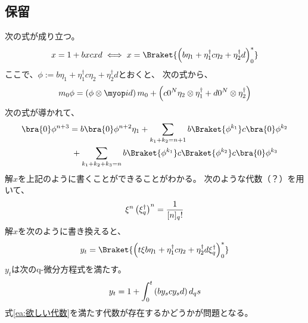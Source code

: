 {\subsection{保留}\label{s2:保留} %
	\begin{todo}[積分作用素]\label{todo:積分作用素} %
		次の式が成り立つ。
		\begin{equation*}\begin{split}
			x = 1 + bxcxd \iff x = \Braket{
				\lr{b\eta_1 + \eta_1^\dag c\eta_2 + \eta_2^\dag d}_0^*}
		\end{split}\end{equation*}
		ここで、$\phi:=b\eta_1 + \eta_1^\dag c\eta_2 + \eta_2^\dag d$とおくと、
		次の式から、
		\begin{equation*}\begin{split}
			m_0\phi = \lr{\phi\otimes\id}m_0 + \lr{c0^N\eta_2\otimes\eta_1^\dag 
			+ d0^N\otimes\eta_2^\dag}
		\end{split}\end{equation*}
		次の式が導かれて、
		\begin{equation*}\begin{split}
			\bra{0}\phi^{n+3} &= b\bra{0}\phi^{n+2}\eta_1
			+ \sum_{k_1+k_2=n+1} b\Braket{\phi^{k_1}}c\bra{0}\phi^{k_2} \\
			&\;+ \sum_{k_1+k_2+k_3=n} b\Braket{\phi^{k_1}}c\Braket{\phi^{k_2}}
				c\bra{0}\phi^{k_3}
		\end{split}\end{equation*}
		解$x$を上記のように書くことができることがわかる。
		次のような代数（？）を用いて、
		\begin{equation}\label{ea:欲しい代数}\begin{split}
			\xi^n\left({\xi_q^\dag}\right)^n = \frac{1}{[n]_q!}
		\end{split}\end{equation}
		解$x$を次のように書き換えると、
		\begin{equation*}\begin{split}
			y_t = \Braket{\lr{t\xi b\eta_1 + \eta_1^\dag c\eta_2 
				+ \eta_2^\dag d \xi_q^\dag}_0^*}
		\end{split}\end{equation*}
		$y_t$は次のq-微分方程式を満たす。
		\begin{equation*}\begin{split}
			y_t = 1 + \int_0^t \left({by_scy_sd}\right) d_qs
		\end{split}\end{equation*}
		式\eqref{ea:欲しい代数}を満たす代数が存在するかどうかが問題となる。


\end{todo}}
